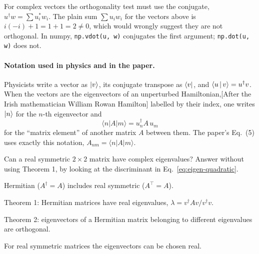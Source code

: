 \begin{pitfall}
For complex vectors the orthogonality test must use the conjugate, $u^\dagger w=\sum u_i^*w_i$. The plain sum $\sum u_iw_i$ for the vectors above is $i(-i)+1=1+1=2\ne0$, which would wrongly suggest they are not orthogonal. In numpy, \texttt{np.vdot(u, w)} conjugates the first argument; \texttt{np.dot(u, w)} does not.
\end{pitfall}

\paragraph{Notation used in physics and in the paper.} Physicists write a vector as $|v\rangle$, its conjugate transpose as $\langle v|$, and $\langle u\,|\,v\rangle=u^\dagger v$. When the vectors are the eigenvectors of an unperturbed Hamiltonian,[After the Irish mathematician William Rowan Hamilton] labelled by their index, one writes $|n\rangle$ for the $n$-th eigenvector and
\begin{equation}
\langle n|A|m\rangle = u_n^\dagger A\,u_m
\label{eq:eigen-matel}
\end{equation}
for the ``matrix element'' of another matrix $A$ between them. The paper's Eq.~(5) uses exactly this notation, $A_{nm}=\langle n|A|m\rangle$.

\begin{checkpoint}
Can a real symmetric $2\times2$ matrix have complex eigenvalues? Answer without using Theorem 1, by looking at the discriminant in Eq.~\eqref{eq:eigen-quadratic}.
\end{checkpoint}

\begin{keyideas}
\item Hermitian ($A^\dagger=A$) includes real symmetric ($A^\top=A$).
\item Theorem 1: Hermitian matrices have real eigenvalues, $\lambda=v^\dagger Av/v^\dagger v$.
\item Theorem 2: eigenvectors of a Hermitian matrix belonging to different eigenvalues are orthogonal.
\item For real symmetric matrices the eigenvectors can be chosen real.
\end{keyideas}

